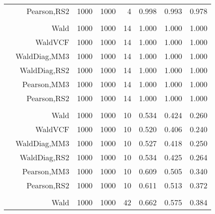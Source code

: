 \documentclass[
]{article}
\begin{document}
\begin{table}[H]
{\begin{tabular}[t]{lrrrrrrr}
\hspace{1em} & Pearson,RS2 & 1000 & 1000 & 4 & 0.998 & 0.993 & 0.978\\
\cmidrule{1-8}
\addlinespace[0.3em]
\multicolumn{8}{l}{\textbf{1F 15V}}\\
\hspace{1em} & Wald & 1000 & 1000 & 14 & 1.000 & 1.000 & 1.000\\

\hspace{1em} & WaldVCF & 1000 & 1000 & 14 & 1.000 & 1.000 & 1.000\\

\hspace{1em} & WaldDiag,MM3 & 1000 & 1000 & 14 & 1.000 & 1.000 & 1.000\\

\hspace{1em} & WaldDiag,RS2 & 1000 & 1000 & 14 & 1.000 & 1.000 & 1.000\\

\hspace{1em} & Pearson,MM3 & 1000 & 1000 & 14 & 1.000 & 1.000 & 1.000\\

\hspace{1em} & Pearson,RS2 & 1000 & 1000 & 14 & 1.000 & 1.000 & 1.000\\
\cmidrule{1-8}
\addlinespace[0.3em]
\multicolumn{8}{l}{\textbf{2F 10V}}\\
\hspace{1em} & Wald & 1000 & 1000 & 10 & 0.534 & 0.424 & 0.260\\

\hspace{1em} & WaldVCF & 1000 & 1000 & 10 & 0.520 & 0.406 & 0.240\\

\hspace{1em} & WaldDiag,MM3 & 1000 & 1000 & 10 & 0.527 & 0.418 & 0.250\\

\hspace{1em} & WaldDiag,RS2 & 1000 & 1000 & 10 & 0.534 & 0.425 & 0.264\\

\hspace{1em} & Pearson,MM3 & 1000 & 1000 & 10 & 0.609 & 0.505 & 0.340\\

\hspace{1em} & Pearson,RS2 & 1000 & 1000 & 10 & 0.611 & 0.513 & 0.372\\
\cmidrule{1-8}
\addlinespace[0.3em]
\multicolumn{8}{l}{\textbf{3F 15V}}\\
\hspace{1em} & Wald & 1000 & 1000 & 42 & 0.662 & 0.575 & 0.384\\


\end{tabular}}
\end{table}
\end{document}
